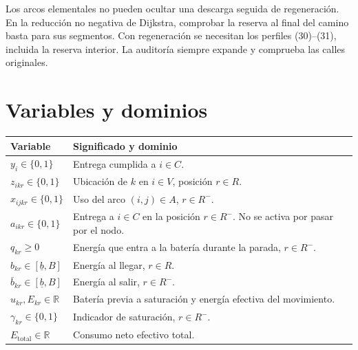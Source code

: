 \documentclass[11pt,a4paper]{article}
\newcommand{\Rminus}{R^{-}}
\newcommand{\reserve}{\underline b}
\begin{document}
Los arcos elementales no pueden ocultar una descarga seguida de regeneración.
En la reducción no negativa de Dijkstra, comprobar la reserva al final del
camino basta para sus segmentos. Con regeneración se necesitan los perfiles
(30)--(31), incluida la reserva interior. La auditoría siempre expande y
comprueba las calles originales.

\section{Variables y dominios}
\begin{tabularx}{\textwidth}{@{}l X@{}}
\toprule
Variable & Significado y dominio\\\midrule
$y_i\in\{0,1\}$ & Entrega cumplida a $i\in C$.\\
$z_{ikr}\in\{0,1\}$ & Ubicación de $k$ en $i\in V$, posición $r\in R$.\\
$x_{ijkr}\in\{0,1\}$ & Uso del arco $(i,j)\in A$, $r\in\Rminus$.\\
$a_{ikr}\in\{0,1\}$ & Entrega a $i\in C$ en la posición $r\in\Rminus$. No se activa por pasar por el nodo.\\
$q_{kr}\ge0$ & Energía que entra a la batería durante la parada, $r\in\Rminus$.\\
$b_{kr}\in[\reserve,B]$ & Energía al llegar, $r\in R$.\\
$\bar b_{kr}\in[\reserve,B]$ & Energía al salir, $r\in\Rminus$.\\
$u_{kr},E_{kr}\in\mathbb R$ & Batería previa a saturación y energía efectiva del movimiento.\\
$\gamma_{kr}\in\{0,1\}$ & Indicador de saturación, $r\in\Rminus$.\\
$E_{\mathrm{total}}\in\mathbb R$ & Consumo neto efectivo total.\\
\bottomrule
\end{tabularx}
\end{document}
